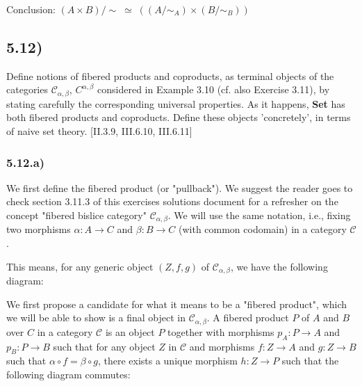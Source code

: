 Conclusion: $(A \times B)/ \sim \; \simeq \; ((A / \sim_A) \times (B / \sim_B))$



\subsection*{5.12)}

Define notions of fibered products and coproducts, as terminal objects of the categories $\mathcal{C}_{\alpha,\beta}$, $C^{\alpha,\beta}$ considered in Example 3.10 (cf. also Exercise 3.11), by stating carefully the corresponding universal properties.
As it happens, \textbf{Set} has both fibered products and coproducts. Define these objects 'concretely', in terms of naive set theory. [II.3.9, III.6.10, III.6.11]


\subsubsection*{5.12.a)}

We first define the fibered product (or "pullback"). We suggest the reader goes to check section 3.11.3 of this exercises solutions document for a refresher on the concept "fibered bislice category" $\mathcal{C}_{\alpha,\beta}$. We will use the same notation, i.e., fixing two morphisms $\alpha : A \to C$ and $\beta : B \to C$ (with common codomain) in a category $\mathcal{C}$.

This means, for any generic object $(Z, f, g)$ of $\mathcal{C}_{\alpha,\beta}$, we have the following diagram:


We first propose a candidate for what it means to be a "fibered product", which we will be able to show is a final object in $\mathcal{C}_{\alpha,\beta}$. A fibered product $P$ of $A$ and $B$ over $C$ in a category $\mathcal{C}$ is an object $P$ together with morphisms $p_A : P \to A$ and $p_B : P \to B$ such that for any object $Z$ in $\mathcal{C}$ and morphisms $f : Z \to A$ and $g : Z \to B$ such that $\alpha \circ f = \beta \circ g$, there exists a unique morphism $h : Z \to P$ such that the following diagram commutes:

